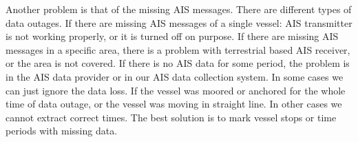 \documentclass[conference]{IEEEtran}
\begin{document}



Another problem is that of the missing AIS messages. There are different types of data outages. If there are missing AIS messages of a single vessel: AIS transmitter is not working properly, or it is turned off on purpose. If there are missing AIS messages in a specific area, there is a problem with terrestrial based AIS receiver, or the area is not covered. If there is no AIS data for some period, the problem is in the AIS data provider or in our AIS data collection system. In some cases we can just ignore the data loss. If the vessel was moored or anchored for the whole time of data outage, or the vessel was moving in straight line. In other cases we cannot extract correct times. The best solution is to mark vessel stops or time periods with missing data. 



\end{document}
